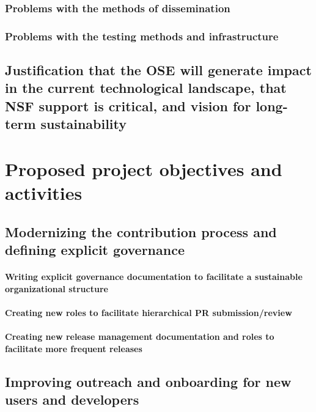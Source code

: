 \documentclass[numbers]{proposalnsf}
\begin{document}
\subsubsection{Problems with the methods of dissemination}

\subsubsection{Problems with the testing methods and infrastructure}

\subsection{Justification that the OSE will generate impact in the current technological landscape, that NSF support is critical, and vision for long-term sustainability}

\section{Proposed project objectives and activities}

\subsection{Modernizing the contribution process and defining explicit governance}


\paragraph{Writing explicit governance documentation to facilitate a sustainable organizational structure}

\paragraph{Creating new roles to facilitate hierarchical PR submission/review}

\paragraph{Creating new release management documentation and roles to facilitate more frequent releases}

\subsection{Improving outreach and onboarding for new users and developers}
\end{document}
